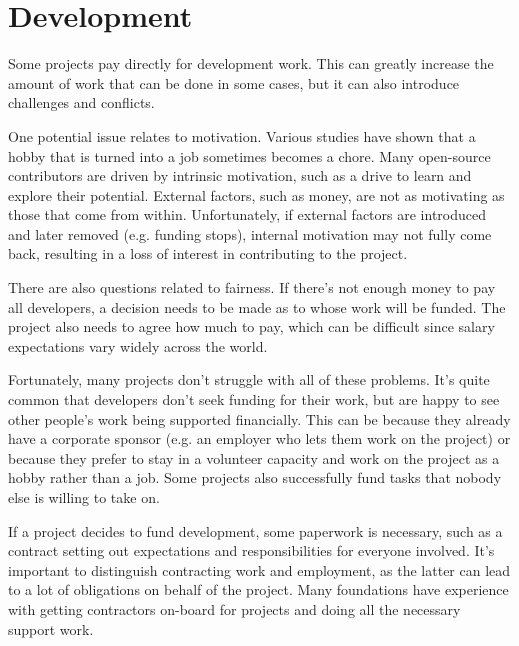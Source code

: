 


\chapter{Development}

Some projects pay directly for development work.  This can greatly increase the amount of work that can be done in some cases, but it can also introduce challenges and conflicts.

One potential issue relates to motivation.  Various studies have shown that a hobby that is turned into a job sometimes becomes a chore.  Many open-source contributors are driven by intrinsic motivation, such as a drive to learn and explore their potential.  External factors, such as money, are not as motivating as those that come from within.  Unfortunately, if external factors are introduced and later removed (e.g. funding stops), internal motivation may not fully come back, resulting in a loss of interest in contributing to the project.

There are also questions related to fairness.  If there's not enough money to pay all developers, a decision needs to be made as to whose work will be funded.  The project also needs to agree how much to pay, which can be difficult since salary expectations vary widely across the world.

Fortunately, many projects don't struggle with all of these problems.  It's quite common that developers don't seek funding for their work, but are happy to see other people's work being supported financially.  This can be because they already have a corporate sponsor (e.g. an employer who lets them work on the project) or because they prefer to stay in a volunteer capacity and work on the project as a hobby rather than a job.  Some projects also successfully fund tasks that nobody else is willing to take on.

If a project decides to fund development, some paperwork is necessary, such as a contract setting out expectations and responsibilities for everyone involved.  It's important to distinguish contracting work and employment, as the latter can lead to a lot of obligations on behalf of the project.  Many foundations have experience with getting contractors on-board for projects and doing all the necessary support work.

